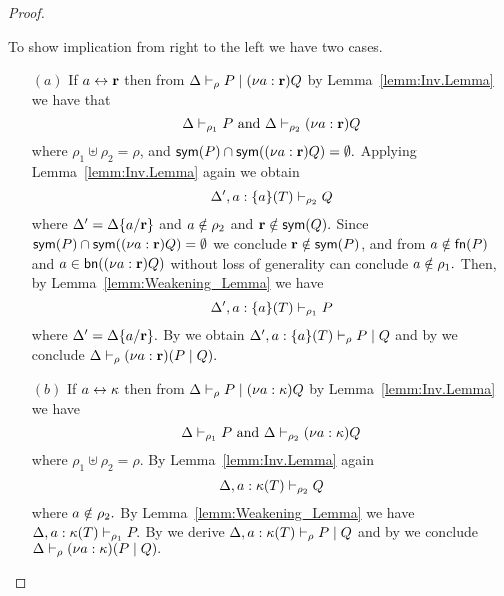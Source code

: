 \begin{proof}
\begin{itemize}
To show implication from right to the left we have two cases.
\begin{itemize}
\item [$(a)$] If $a \leftrightarrow {\mathbf{r}}$ then from $ \Delta\vdash_\rho P\;|\; (\nu a: {\mathbf{r}})Q$ by Lemma~\ref{lemm:Inv.Lemma} we have that 
\[ 
\Delta\vdash_{\rho_1} P \text{ and } \Delta\vdash_{\rho_2}  (\nu a: {\mathbf{r}})Q
\] 
where $\rho_1\uplus\rho_2=\rho$, and $\mathsf{sym}(P) \cap \mathsf{sym}((\nu a: {\mathbf{r}})Q)=\emptyset.$  
Applying Lemma~\ref{lemm:Inv.Lemma} again we obtain 
\[ 
\Delta',a:\{a\}(T)\vdash_{\rho_2} Q
\] 
where $\Delta'=\Delta\{a/{\mathbf{r}}\}$ and $a\notin\rho_2$ and ${\mathbf{r}}\notin\mathsf{sym}(Q).$ Since $\mathsf{sym}(P) \cap \mathsf{sym}((\nu a: {\mathbf{r}})Q)=\emptyset$ we conclude ${\mathbf{r}}\notin\mathsf{sym}(P)$, and from $a\notin\mathsf{fn}(P)$ and $a\in\mathsf{bn}((\nu a : {\mathbf{r}})Q)$ without loss of generality can conclude $a\notin\rho_1.$ Then, by Lemma~\ref{lemm:Weakening_Lemma} we have 
\[
\Delta',a:\{a\}(T)\vdash_{\rho_1}P
\] 
where $\Delta'=\Delta\{a/{\mathbf{r}}\}.$ 
By  we obtain $ \Delta',a:\{a\}(T)\vdash_\rho P\;|\;Q$ and by  we conclude $ \Delta\vdash_\rho (\nu a: {\mathbf{r}})(P\;|\;Q).$
%
%
\item [$(b)$] If $a \leftrightarrow {\mathbf{\kappa}}$ then from $ \Delta\vdash_\rho P\;|\; (\nu a: {\mathbf{\kappa}})Q$ by Lemma~\ref{lemm:Inv.Lemma} we have 
\[ 
\Delta\vdash_{\rho_1} P \text{ and } \Delta\vdash_{\rho_2}  (\nu a: {\mathbf{\kappa}})Q
\] 
where $\rho_1\uplus\rho_2=\rho.$ 
By Lemma~\ref{lemm:Inv.Lemma} again  
\[
\Delta,a:{\mathbf{\kappa}}(T)\vdash_{\rho_2} Q
\] 
where $a\notin\rho_2.$ 
By Lemma~\ref{lemm:Weakening_Lemma} we have $ \Delta,a:{\mathbf{\kappa}}(T)\vdash_{\rho_1}P.$ 
By  we derive $ \Delta,a:{\mathbf{\kappa}}(T)\vdash_\rho P\;|\;Q$ and by  we conclude $ \Delta\vdash_\rho (\nu a: {\mathbf{\kappa}})(P\;|\;Q).$
\end{itemize}



\end{itemize}
\end{proof}
